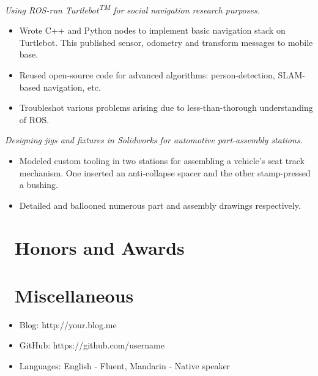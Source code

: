 \documentclass{resume}
\begin{document}
\textit{Using ROS-run Turtlebot\textsuperscript{TM} for social navigation research purposes.}
\begin{itemize}
  \item Wrote C++ and Python nodes to implement basic navigation stack on Turtlebot. This published sensor, odometry and transform messages to mobile base.
  \item Reused open-source code for advanced algorithms: person-detection, SLAM-based navigation, etc.
  \item Troubleshot various problems arising due to less-than-thorough understanding of ROS.
\end{itemize}

\textit{Designing jigs and fixtures in Solidworks for automotive part-assembly stations.}
\begin{itemize}
  \item Modeled custom tooling in two stations for assembling a vehicle's seat track mechanism. One inserted an anti-collapse spacer and the other stamp-pressed a bushing.
  \item Detailed and ballooned numerous part and assembly drawings respectively.
\end{itemize}

\section{\faHeartO\ Honors and Awards}

\section{\faInfo\ Miscellaneous}
\begin{itemize}[parsep=0.5ex]
  \item Blog: http://your.blog.me
  \item GitHub: https://github.com/username
  \item Languages: English - Fluent, Mandarin - Native speaker
\end{itemize}
\end{document}
